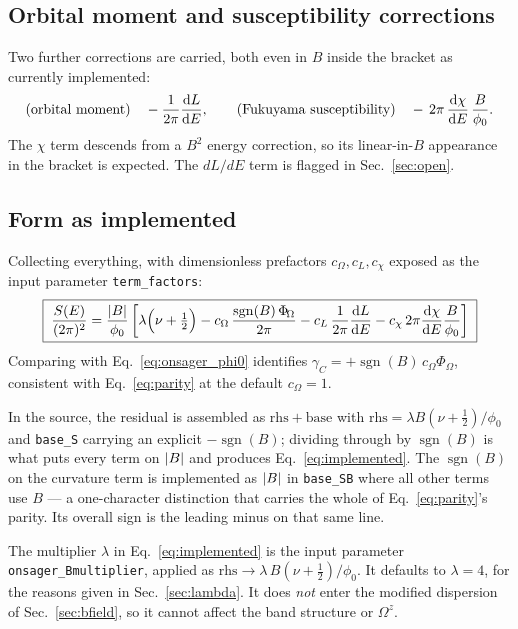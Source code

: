 \documentclass[11pt]{article}
\newcommand{\Om}{\Omega}
\newcommand{\Bfield}{B}
\newcommand{\sgn}{\operatorname{sgn}}
\newcommand{\Phib}{\Phi_{\!\Om}}
\newcommand{\code}[1]{\texttt{#1}}
\begin{document}
\subsection{Orbital moment and susceptibility corrections}

Two further corrections are carried, both even in $\Bfield$ inside the
bracket as currently implemented:
\begin{equation}
  \text{(orbital moment)}\quad -\frac{1}{2\pi}\dv{L}{E},
  \qquad
  \text{(Fukuyama susceptibility)}\quad
  -\,2\pi\,\dv{\chi}{E}\,\frac{\Bfield}{\phi_0}.
\end{equation}
The $\chi$ term descends from a $\Bfield^2$ energy correction, so its
linear-in-$\Bfield$ appearance in the bracket is expected.  The
$dL/dE$ term is flagged in Sec.~\ref{sec:open}.

\subsection{Form as implemented}

Collecting everything, with dimensionless prefactors $c_\Om, c_L,
c_\chi$ exposed as the input parameter \code{term\_factors}:
\begin{equation}\label{eq:implemented}
  \boxed{\;
  \frac{S(E)}{(2\pi)^2}
  = \frac{\abs{\Bfield}}{\phi_0}
  \left[
    \lambda\Bigl(\nu + \tfrac12\Bigr)
    - c_\Om\,\frac{\sgn(\Bfield)\,\Phib}{2\pi}
    - c_L\,\frac{1}{2\pi}\dv{L}{E}
    - c_\chi\, 2\pi \dv{\chi}{E}\frac{\Bfield}{\phi_0}
  \right]
  \;}
\end{equation}
Comparing with Eq.~\eqref{eq:onsager_phi0} identifies
$\gamma_C = +\sgn(\Bfield)\,c_\Om \Phib$, consistent with
Eq.~\eqref{eq:parity} at the default $c_\Om = 1$.

In the source, the residual is assembled as
$\mathrm{rhs} + \mathrm{base}$ with
$\mathrm{rhs} = \lambda\Bfield(\nu+\tfrac12)/\phi_0$ and \code{base\_S}
carrying an explicit $-\sgn(\Bfield)$; dividing through by
$\sgn(\Bfield)$ is what puts every term on $\abs{\Bfield}$ and produces
Eq.~\eqref{eq:implemented}.  The $\sgn(\Bfield)$ on the curvature term is
implemented as $\abs{\Bfield}$ in \code{base\_SB} where all other terms
use $\Bfield$ --- a one-character distinction that carries the whole of
Eq.~\eqref{eq:parity}'s parity.  Its overall sign is the leading minus on
that same line.

The multiplier $\lambda$ in Eq.~\eqref{eq:implemented} is the input
parameter \code{onsager\_Bmultiplier}, applied as
$\mathrm{rhs} \to \lambda\,\Bfield(\nu+\tfrac12)/\phi_0$.  It defaults to
$\lambda = 4$, for the reasons given in Sec.~\ref{sec:lambda}.  It does
\emph{not} enter the modified dispersion of Sec.~\ref{sec:bfield}, so it
cannot affect the band structure or $\Om^z$.
\end{document}
